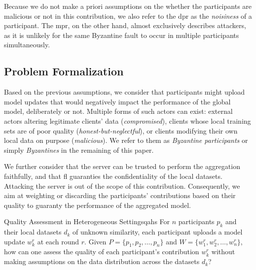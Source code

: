 Because we do not make a priori assumptions on the whether the participants are malicious or not in this contribution, we also refer to the \gls{dpr} as the \emph{noisiness} of a participant.
The \gls{mpr}, on the other hand, almost exclusively describes attackers, as it is unlikely for the same Byzantine fault to occur in multiple participants simultaneously.

\subsection{Problem Formalization\label{sec:problem.formalization}}

Based on the previous assumptions, we consider that participants might upload model updates that would negatively impact the performance of the global model, deliberately or not.
Multiple forms of such actors can exist: external actors altering legitimate clients' data (\ie \emph{compromised}), clients whose local training sets are of poor quality (\ie \emph{honest-but-neglectful}), or clients modifying their own local data on purpose (\ie \emph{malicious}).
We refer to them as \emph{Byzantine participants} or simply \emph{Byzantines} in the remaining of this paper.

We further consider that the server can be trusted to perform the aggregation faithfully, and that \gls{fl} guaranties the confidentiality of the local datasets.
Attacking the server is out of the scope of this contribution.
Consequently, we aim at weighting or discarding the participants' contributions based on their quality to guaranty the performance of the aggregated model.



\begin{problembox}{Quality Assessment in Heterogeneous Settings}{qahs}
  For $n$ participants $p_k$ and their local datasets $d_k$ of unknown similarity, each participant uploads a model update $w_k^r$ at each round $r$. Given $P = \lbrace p_1, p_2, \dots, p_n \rbrace$ and $W = \lbrace w_1^r, w_2^r, \dots, w_n^r \rbrace$, how can one assess the quality of each participant's contribution $w_k^r$ without making assumptions on the data distribution across the datasets $d_k$?
\end{problembox}